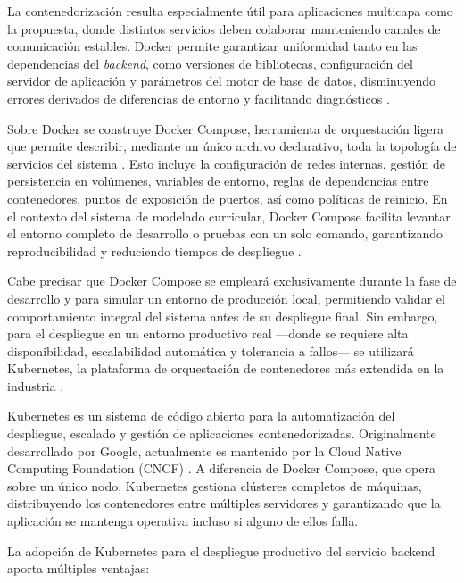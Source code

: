La contenedorización resulta especialmente útil para aplicaciones multicapa como 
la propuesta, donde distintos servicios deben colaborar manteniendo canales de 
comunicación estables. Docker permite garantizar uniformidad tanto en las 
dependencias del \textit{backend}, como versiones de bibliotecas, configuración del servidor 
de aplicación y parámetros del motor de base de datos, disminuyendo errores 
derivados de diferencias de entorno y facilitando diagnósticos \citep{docker2024docs}.

Sobre Docker se construye Docker Compose, herramienta de orquestación ligera que 
permite describir, mediante un único archivo declarativo, toda la topología de 
servicios del sistema \citep{docker2024docs}. Esto incluye la configuración de redes internas, gestión 
de persistencia en volúmenes, variables de entorno, reglas de dependencias entre 
contenedores, puntos de exposición de puertos, así como políticas de reinicio. 
En el contexto del sistema de modelado curricular, Docker Compose facilita levantar 
el entorno completo de desarrollo o pruebas con un solo comando, garantizando 
reproducibilidad y reduciendo tiempos de despliegue \citep{boettiger2015introduction}.

Cabe precisar que Docker Compose se empleará exclusivamente durante la fase de 
desarrollo y para simular un entorno de producción local, permitiendo validar el 
comportamiento integral del sistema antes de su despliegue final. Sin embargo, para 
el despliegue en un entorno productivo real —donde se requiere alta disponibilidad, 
escalabilidad automática y tolerancia a fallos— se utilizará Kubernetes, la plataforma 
de orquestación de contenedores más extendida en la industria \citep{kubernetes2025docs}.

Kubernetes es un sistema de código abierto para la automatización del despliegue, 
escalado y gestión de aplicaciones contenedorizadas. Originalmente desarrollado por 
Google, actualmente es mantenido por la Cloud Native Computing Foundation 
(CNCF) \citep{kubernetes2025overview}. A diferencia de Docker Compose, que opera 
sobre un único nodo, Kubernetes gestiona clústeres completos de máquinas, 
distribuyendo los contenedores entre múltiples servidores y garantizando que la 
aplicación se mantenga operativa incluso si alguno de ellos falla.

La adopción de Kubernetes para el despliegue productivo del servicio backend 
aporta múltiples ventajas:

